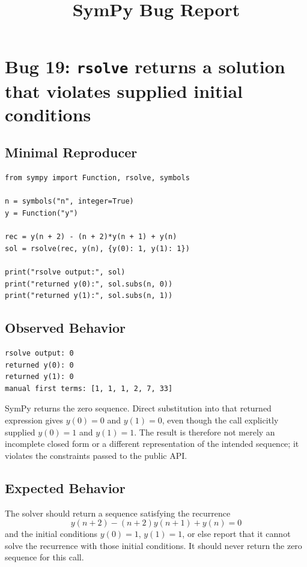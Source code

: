 \documentclass[11pt]{article}
\title{SymPy Bug Report}
\author{}
\date{}
\begin{document}
\maketitle

\section{Bug 19: \texttt{rsolve} returns a solution that violates supplied initial conditions}

\subsection{Minimal Reproducer}

\medskip

\begin{lstlisting}[style=bugpython]
from sympy import Function, rsolve, symbols

n = symbols("n", integer=True)
y = Function("y")

rec = y(n + 2) - (n + 2)*y(n + 1) + y(n)
sol = rsolve(rec, y(n), {y(0): 1, y(1): 1})

print("rsolve output:", sol)
print("returned y(0):", sol.subs(n, 0))
print("returned y(1):", sol.subs(n, 1))
\end{lstlisting}

\subsection{Observed Behavior}

\medskip

\begin{lstlisting}[style=bugpython]
rsolve output: 0
returned y(0): 0
returned y(1): 0
manual first terms: [1, 1, 1, 2, 7, 33]
\end{lstlisting}

SymPy returns the zero sequence.  Direct substitution into that returned expression gives
\(y(0)=0\) and \(y(1)=0\), even though the call explicitly supplied
\(y(0)=1\) and \(y(1)=1\).  The result is therefore not merely an incomplete
closed form or a different representation of the intended sequence; it violates
the constraints passed to the public API.

\subsection{Expected Behavior}

The solver should return a sequence satisfying the recurrence
\[
    y(n+2) - (n+2)y(n+1) + y(n) = 0
\]
and the initial conditions \(y(0)=1\), \(y(1)=1\), or else report that it cannot
solve the recurrence with those initial conditions.  It should never return the
zero sequence for this call.
\end{document}
